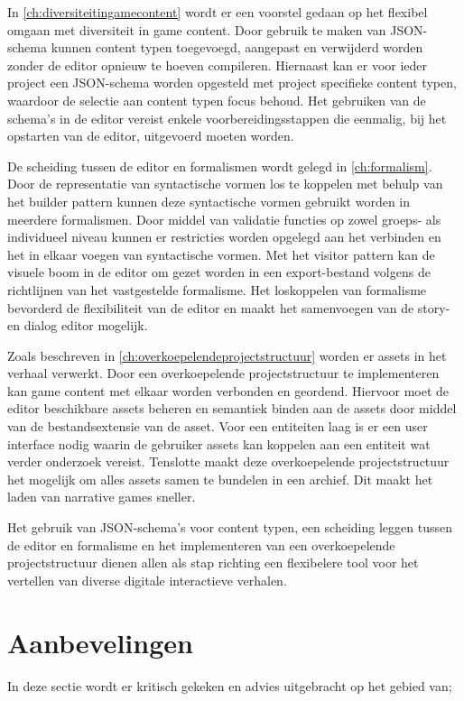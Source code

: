 In \autoref{ch:diversiteitingamecontent} wordt er een voorstel gedaan op het flexibel omgaan met diversiteit in game content. Door gebruik te maken van JSON-schema kunnen content typen toegevoegd, aangepast en verwijderd worden zonder de editor opnieuw te hoeven compileren. Hiernaast kan er voor ieder project een JSON-schema worden opgesteld met project specifieke content typen, waardoor de selectie aan content typen focus behoud. Het gebruiken van de schema’s in de editor vereist enkele voorbereidingsstappen die eenmalig, bij het opstarten van de editor, uitgevoerd moeten worden.

De scheiding tussen de editor en formalismen wordt gelegd in \autoref{ch:formalism}. Door de representatie van syntactische vormen los te koppelen met behulp van het builder pattern kunnen deze syntactische vormen gebruikt worden in meerdere formalismen. Door middel van validatie functies op zowel groeps- als individueel niveau kunnen er restricties worden opgelegd aan het verbinden en het in elkaar voegen van syntactische vormen. Met het visitor pattern kan de visuele boom in de editor om gezet worden in een export-bestand volgens de richtlijnen van het vastgestelde formalisme. Het loskoppelen van formalisme bevorderd de flexibiliteit van de editor en maakt het samenvoegen van de story- en dialog editor mogelijk.

Zoals beschreven in \autoref{ch:overkoepelendeprojectstructuur} worden er assets in het verhaal verwerkt. Door een overkoepelende projectstructuur te implementeren kan game content met elkaar worden verbonden en geordend. Hiervoor moet de editor beschikbare assets beheren en semantiek binden aan de assets door middel van de bestandsextensie van de asset. Voor een entiteiten laag is er een user interface nodig waarin de gebruiker assets kan koppelen aan een entiteit wat verder onderzoek vereist. Tenslotte maakt deze overkoepelende projectstructuur het mogelijk om alles assets samen te bundelen in een archief. Dit maakt het laden van narrative games sneller.

Het gebruik van JSON-schema’s voor content typen, een scheiding leggen tussen de editor en formalisme en het implementeren van een overkoepelende projectstructuur dienen allen als stap richting een flexibelere tool voor het vertellen van diverse digitale interactieve verhalen.

\section{Aanbevelingen}
\label{sec:aanbevelingen}
In deze sectie wordt er kritisch gekeken en advies uitgebracht op het gebied van;


